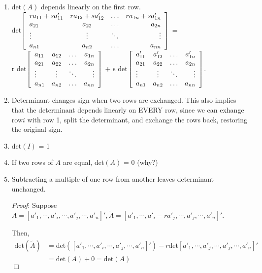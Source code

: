 \documentclass[12pt,oneside]{article}
\begin{document}
\begin{enumerate}
\item det$(A)$ depends linearly on the first row. \\ det$\left[
    \begin{array} {l c c r} r a_{11} + s a_{11}' & r a_{12} + s a_{12}' &
      \ldots & r a_{1n} + s a_{1n}' \\ a_{21} & a_{22} & \ldots & a_{2n} \\
      \vdots & \vdots & \ddots & \vdots \\ a_{n1} & a_{n2} & \ldots &
      a_{nn} \end{array} \right]$ = \\

r det$\left[ \begin{array} {l c c r}
      a_{11} & a_{12} & \ldots & a_{1n} \\ a_{21} & a_{22} & \ldots &
      a_{2n} \\ \vdots & \vdots & \ddots & \vdots \\ a_{n1} & a_{n2} &
      \ldots & a_{nn} \end{array} \right]$ + s det$\left[ \begin{array} {l c c r}
      a_{11}' & a_{12}' & \ldots & a_{1n}' \\ a_{21} & a_{22} & \ldots &
      a_{2n} \\ \vdots & \vdots & \ddots & \vdots \\ a_{n1} & a_{n2} &
      \ldots & a_{nn} \end{array} \right]$.\\


\item Determinant changes sign when two rows are exchanged. This also
  implies that the determinant depends linearly on EVERY row, since we
  can exhange row$i$ with row 1, split the determinant, and exchange
  the rows back, restoring the original sign.
\item det$(I)$ = 1

\item If two rows of $A$ are equal, det$(A)$ = 0 (why?)

\item Subtracting a multiple of one row from another leaves
  determinant unchanged.

  \emph{Proof}: Suppose $A = \left[ a'_1, \cdots, a'_i, \cdots, a'_j, \cdots, a'_n \right]', \tilde{A} = \left[ a'_1, \cdots, a'_i - r a'_j, \cdots, a'_j, \cdots, a'_n \right]'$.
  
  Then, $$\begin{aligned}\text{det}(\tilde{A}) &= \text{det}(\left[ a'_1, \cdots, a'_i, \cdots, a'_j, \cdots, a'_n \right]') - r \text{det}\left[ a'_1, \cdots, a'_j, \cdots, a'_j, \cdots, a'_n \right]'\\
  &= \text{det}(A) + 0 = \text{det}(A)
  \end{aligned}$$
$\Box$


\end{enumerate}
\end{document}
